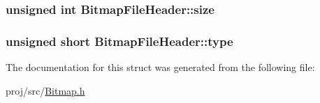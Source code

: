 \subsubsection[{\texorpdfstring{size}{size}}]{\setlength{\rightskip}{0pt plus 5cm}unsigned int Bitmap\+File\+Header\+::size}\hypertarget{structBitmapFileHeader_a0dcad71d9b17783c4d296c2c6d00ede0}{}\label{structBitmapFileHeader_a0dcad71d9b17783c4d296c2c6d00ede0}
\subsubsection[{\texorpdfstring{type}{type}}]{\setlength{\rightskip}{0pt plus 5cm}unsigned short Bitmap\+File\+Header\+::type}\hypertarget{structBitmapFileHeader_a139c2c2645bc00ddf4f5dc552872c1d1}{}\label{structBitmapFileHeader_a139c2c2645bc00ddf4f5dc552872c1d1}


The documentation for this struct was generated from the following file\+:\begin{DoxyCompactItemize}
\item 
proj/src/\hyperlink{Bitmap_8h}{Bitmap.\+h}\end{DoxyCompactItemize}
